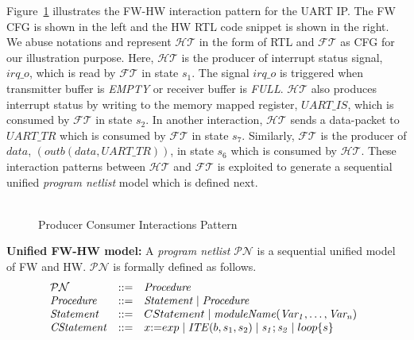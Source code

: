 \documentclass[sigconf]{acmart}
\newcommand{\Omit}[1]{}
\begin{document}
\Omit{
shared register only FT is writing 
shared register that HT is writing 
and these two sets are disjoint
$\mathcal{FT}$ and $\mathcal{HT}$ is said to exhibit   
{\em producer-consumer} interaction pattern specific 
to data $d$ if $\mathcal{FT}$ produces $d$ and $\mathcal{HT}$ 
consumes $d$. Similarly, when $\mathcal{HT}$
is a producer of $d$ and $\mathcal{FT}$ is a consumer of $d$, 
$\mathcal{HT}$ and $\mathcal{FT}$ is said to exhibit   
{\em producer-consumer} interaction pattern specific to $d$. 
A producer-consumer interaction is defined with respect 
to the data produced. 
}

Figure~\ref{fig:interleaving1} illustrates the FW-HW interaction pattern 
for the UART IP. The FW CFG is shown in the left and the 
HW RTL code snippet is shown in the right. We abuse notations and 
represent $\mathcal{HT}$ in the form of RTL and $\mathcal{FT}$ as CFG
for our illustration purpose. Here, $\mathcal{HT}$ is the producer of interrupt 
status signal, $irq\_o$, which is read by $\mathcal{FT}$ in state $s_1$. 
The signal $irq\_o$ is  triggered when transmitter buffer is 
{\em EMPTY} or receiver buffer is {\em FULL}. 
$\mathcal{HT}$ also produces interrupt status by writing to the 
memory mapped register, $UART\_IS$, which is consumed by 
$\mathcal{FT}$ in state $s_2$.  In another interaction, $\mathcal{HT}$
sends a data-packet to $UART\_TR$ which is consumed by $\mathcal{FT}$ in state $s_7$.
Similarly, $\mathcal{FT}$ is the producer of $data$, $(outb(data,UART\_TR))$, 
in state $s_6$ which is consumed by $\mathcal{HT}$. These interaction patterns 
between $\mathcal{HT}$ and $\mathcal{FT}$ is exploited to generate a 
sequential unified {\em program netlist} model which is defined next.\\ \\
%
\begin{figure}[t]
\caption{Producer Consumer Interactions Pattern
\label{fig:interleaving1}}
\end{figure}
%
{\bf Unified FW-HW model:}
A {\em program netlist} $\mathcal{PN}$ is a sequential unified
model of FW and HW. $\mathcal{PN}$ is formally defined as follows.
\[ 
\begin{array}[t]{@{}lll}
\mathcal{PN} & {:}{:}{=} & \mathit{Procedure} \\
\mathit{Procedure} & {:}{:}{=} & \mathit{Statement} \mid \mathit{Procedure} \\
\mathit{Statement} & {:}{:}{=} & CStatement \mid \mathit{moduleName(Var_1,\dots,Var_n)} \\
\mathit{CStatement} & {:}{:}{=} & x {:}{=} exp \mid \mathit{ITE}(b, s_1,s_2) \mid \mathit{s_1;s_2} \mid loop\{s\} \\ 
\end{array}
\]
\end{document}

